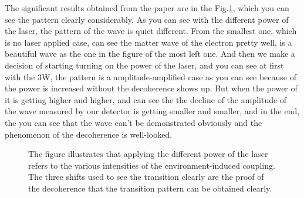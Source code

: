 \documentclass[final,1p,12pt]{elsarticle}
\begin{document}
The significant results obtained from the paper are in the Fig.\ref{333}, which you can see the pattern clearly considerably. As you can see with the different power of the laser, the pattern of the wave is quiet different. From the smallest one, which is no laser applied case, can see the matter wave of the electron pretty well, is a beautiful wave as the one in the figure of the most left one. And then we make a decision of starting turning on the power of the laser, and you can see at first with the 3W, the pattern is a amplitude-amplified case as you can see because of the power is increased without the decoherence shows up. But when the power of it is getting higher and higher, and can see the the decline of the amplitude of the wave measured by our detector is getting smaller and smaller, and in the end, the you can see that the wave can't be demonstrated obviously and the phenomenon of the decoherence is well-looked.\\ 
\begin{figure}
\begin{center}
\end{center}
\caption{The figure illustrates that applying the different power of the laser refers to the various intensities of the environment-induced coupling. The three shifts used to see the transition clearly are the proof of the decoherence that the transition pattern can be obtained clearly.}
\label{333}
\end{figure}
\end{document}
